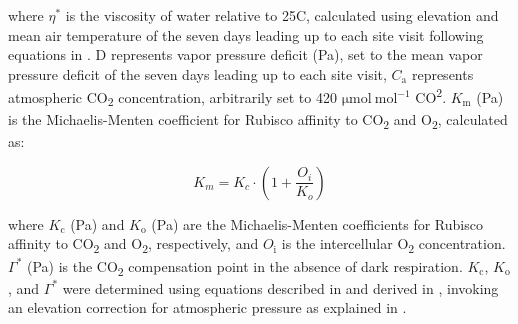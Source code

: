 \noindent where $\eta^{*}$ is the viscosity of water relative to 25\textdegree{}C, calculated using elevation and mean air temperature of the seven days leading up to each site visit following equations in . D represents vapor pressure deficit (Pa), set to the mean vapor pressure deficit of the seven days leading up to each site visit, $C_\mathrm{a}$ represents atmospheric CO\textsubscript{2} concentration, arbitrarily set to 420 $\mathrm{\mu mol\ mol^{-1}}$ CO\textsuperscript{2}. $K_\mathrm{m}$ (Pa) is the Michaelis-Menten coefficient for Rubisco affinity to CO\textsubscript{2} and O\textsubscript{2}, calculated as:
    
\begin{equation} \label{eq_4.6}
    K_{m} = K_{c} \cdot \left ( 1 + \frac{O_i}{K_o} \right )
\end{equation}

\noindent where $K_\mathrm{c}$ (Pa) and $K_\mathrm{o}$ (Pa) are the Michaelis-Menten coefficients for Rubisco affinity to CO\textsubscript{2} and O\textsubscript{2}, respectively, and $O_\mathrm{i}$  is the intercellular O\textsubscript{2} concentration. $\Gamma^{*}$ (Pa) is the CO\textsubscript{2} compensation point in the absence of dark respiration. $K_\mathrm{c}$, $K_\mathrm{o}$, and $\Gamma^{*}$ were determined using equations described in  and derived in , invoking an elevation correction for atmospheric pressure as explained in .
\clearpage

